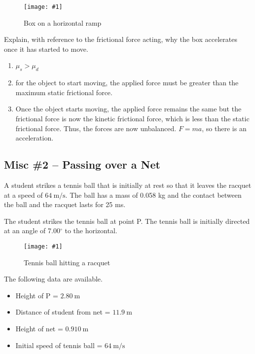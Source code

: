\documentclass[a4paper,12pt]{article}
\newcommand{\degsym}{^{\circ}}
\newcommand{\img}[4]{\begin{center}
  \begin{figure}[H]
    \centering
    \texttt{[image: \#1]}
    \caption{#3}
    \label{fig:#4}
  \end{figure}
\end{center}}
\begin{document}
\begin{enumerate}[label=(\alph*)]
        \img{ex/3.png}{0.35}{Box on a horizontal ramp}{boxhorizontal}

        Explain, with reference to the frictional force acting, why the box accelerates once
        it has started to move.
        \begin{enumerate}[label=\arabic*.]
          \item $\mu_s > \mu_d$
          \item for the object to start moving, the applied force must be greater than the maximum static frictional force.
          \item Once the object starts moving, the applied force remains the same but the frictional force is now the kinetic frictional force, which is less than the static frictional force. Thus, the forces are now unbalanced. $F = ma$, so there is an acceleration.
        \end{enumerate}
\end{enumerate}

\subsection{Misc \#2 -- Passing over a Net}

A student strikes a tennis ball that is initially at rest so that it leaves the racquet at a
speed of $\SI{64}{\m\per\s}$. The ball has a mass of 0.058 kg and the contact between the ball and the racquet lasts for 25 ms.

The student strikes the tennis ball at point P. The tennis ball is initially directed at an angle of 7.00$\degsym$ to the horizontal.

\img{ex/4.png}{0.8}{Tennis ball hitting a racquet}{tennisball}

The following data are available.
\begin{itemize}
  \item Height of P = $\SI{2.80}{\m}$
  \item Distance of student from net = $\SI{11.9}{\m}$
  \item Height of net = $\SI{0.910}{\m}$
  \item Initial speed of tennis ball = $\SI{64}{\m\per\s}$
\end{itemize}
\end{document}
